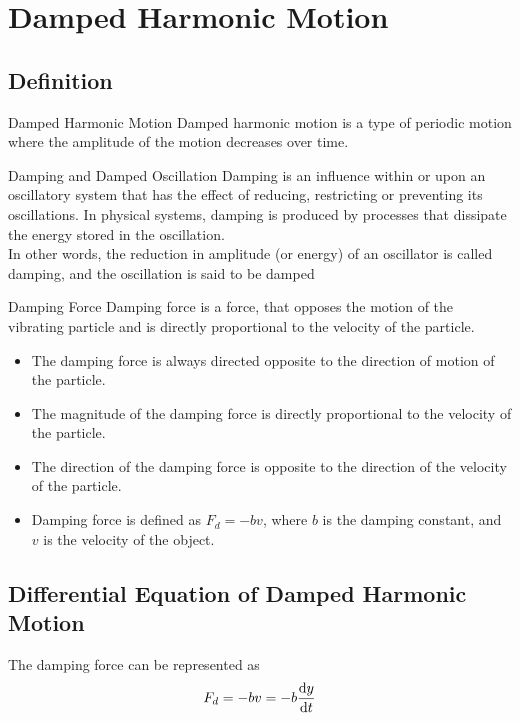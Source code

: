 \documentclass[12pt]{article}
\numberwithin{equation}{subsection}
\begin{document}
\section{Damped Harmonic Motion}
\subsection{Definition}

\begin{definition}{Damped Harmonic Motion}{}
    Damped harmonic motion is a type of periodic motion where the amplitude of the motion decreases over time.
\end{definition}

\begin{definition}{Damping and Damped Oscillation}{}
    Damping is an influence within or upon an oscillatory system that has the effect of reducing, restricting or preventing its oscillations. In physical systems, damping is produced by processes that dissipate the energy stored in the oscillation. \\
    In other words, the reduction in amplitude (or energy) of an oscillator is called damping, and the oscillation is said to be damped
\end{definition}

\begin{definition}{Damping Force}{}
    Damping force is a force, that opposes the motion of the vibrating particle and is directly proportional to the velocity of the particle.
    \begin{itemize}
        \item The damping force is always directed opposite to the direction of motion of the particle.
        \item The magnitude of the damping force is directly proportional to the velocity of the particle.
        \item The direction of the damping force is opposite to the direction of the velocity of the particle.
        \item Damping force is defined as $F_d = -bv$, where $b$ is the damping constant, and $v$ is the velocity of the object.
    \end{itemize}
\end{definition}

\subsection{Differential Equation of Damped Harmonic Motion}
The damping force can be represented as \[
    F_d = -bv = -b \dv{y}{t}
\]
\end{document}
